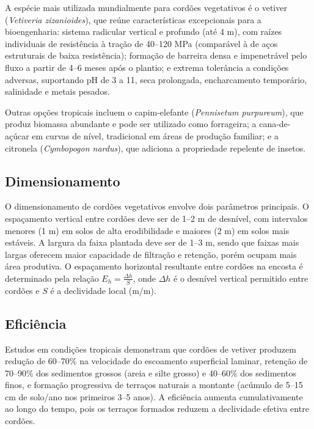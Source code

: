 \documentclass[
  portuguese,
  11pt,
  a4paper,
  open=any]{scrbook}
\begin{document}
A espécie mais utilizada mundialmente para cordões vegetativos é o
vetiver (\emph{Vetiveria zizanioides}), que reúne características
excepcionais para a bioengenharia: sistema radicular vertical e profundo
(até 4 m), com raízes individuais de resistência à tração de 40--120 MPa
(comparável à de aços estruturais de baixa resistência); formação de
barreira densa e impenetrável pelo fluxo a partir de 4--6 meses após o
plantio; e extrema tolerância a condições adversas, suportando pH de 3 a
11, seca prolongada, encharcamento temporário, salinidade e metais
pesados.

Outras opções tropicais incluem o capim-elefante (\emph{Pennisetum
purpureum}), que produz biomassa abundante e pode ser utilizado como
forrageira; a cana-de-açúcar em curvas de nível, tradicional em áreas de
produção familiar; e a citronela (\emph{Cymbopogon nardus}), que
adiciona a propriedade repelente de insetos.

\subsection{Dimensionamento}\label{dimensionamento-4}

O dimensionamento de cordões vegetativos envolve dois parâmetros
principais. O espaçamento vertical entre cordões deve ser de 1--2 m de
desnível, com intervalos menores (1 m) em solos de alta erodibilidade e
maiores (2 m) em solos mais estáveis. A largura da faixa plantada deve
ser de 1--3 m, sendo que faixas mais largas oferecem maior capacidade de
filtração e retenção, porém ocupam mais área produtiva. O espaçamento
horizontal resultante entre cordões na encosta é determinado pela
relação \(E_h = \frac{\Delta h}{S}\), onde \(\Delta h\) é o desnível
vertical permitido entre cordões e \(S\) é a declividade local (m/m).

\subsection{Eficiência}\label{eficiuxeancia-1}

Estudos em condições tropicais demonstram que cordões de vetiver
produzem redução de 60--70\% na velocidade do escoamento superficial
laminar, retenção de 70--90\% dos sedimentos grossos (areia e silte
grosso) e 40--60\% dos sedimentos finos, e formação progressiva de
terraços naturais a montante (acúmulo de 5--15 cm de solo/ano nos
primeiros 3--5 anos). A eficiência aumenta cumulativamente ao longo do
tempo, pois os terraços formados reduzem a declividade efetiva entre
cordões.
\end{document}

